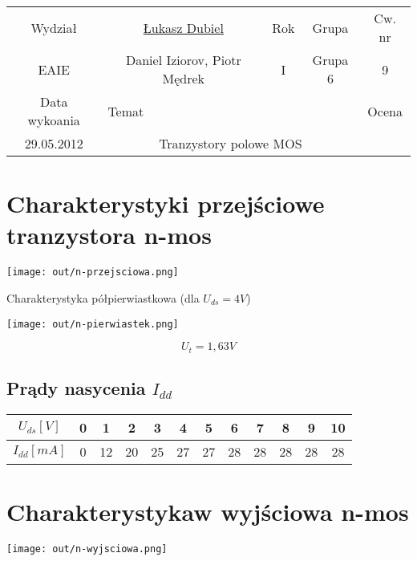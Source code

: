 \documentclass[11pt]{article}
\begin{document}
\begin{center}
\begin{tabular}{|c|c|c|c|c|}
\hline
Wydział & \underline{Łukasz Dubiel} & Rok & Grupa & Cw. nr \\
EAIE & Daniel Iziorov, Piotr Mędrek & I & Grupa 6 & 9 \\
\hline
Data wykoania & \multicolumn{3}{|l|}{Temat} & Ocena \\
29.05.2012 &  \multicolumn{3}{|p{10.5cm}|}{Tranzystory polowe MOS} & \\
\hline
\end{tabular}
\end{center}

\section{Charakterystyki przejściowe tranzystora n-mos}

\begin{center}
\texttt{[image: out/n-przejsciowa.png]}
\end{center}

Charakterystyka półpierwiastkowa (dla $U_{ds} = 4V$)

\begin{center}
\texttt{[image: out/n-pierwiastek.png]}
\end{center}

$$ U_t = 1,63V $$


\subsection{Prądy nasycenia $I_{dd}$}
\begin{center}
  \begin{tabular}{|c|c|c|c|c|c|c|c|c|c|c|c|}
    \hline
    $U_{ds} [V]$ & 0 & 1 & 2 & 3 & 4 & 5 & 6 & 7 & 8 & 9 & 10 \\
    \hline
    $I_{dd} [mA]$ & 0 & 12 & 20 & 25 & 27 & 27 & 28 & 28 & 28 & 28 & 28 \\
    \hline
  \end{tabular}
\end{center}

\section{Charakterystykaw wyjściowa n-mos}

\begin{center}
\texttt{[image: out/n-wyjsciowa.png]}
\end{center}
\end{document}
